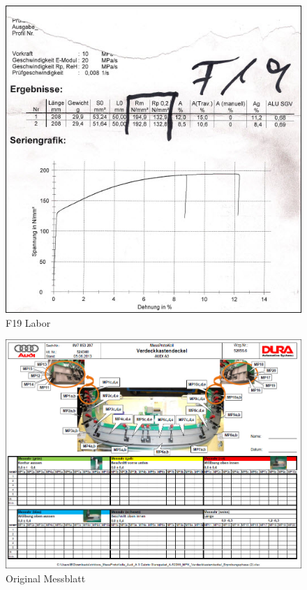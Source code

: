 \documentclass[12pt,a4paper,parskip]{scrartcl}
\begin{document}
\begin{figure}[hbtp]
\centering
\includegraphics[width=1\textwidth]{F19Labor.jpg}
\caption{F19 Labor}
\end{figure}
\begin{figure}[hbtp]
\centering
\includegraphics[width=1\textwidth]{MessblattOriginal.jpg}
\caption{Original Messblatt}
\end{figure}
\end{document}
